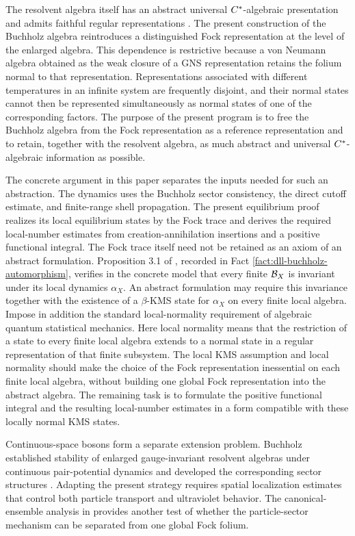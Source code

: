 \documentclass[11pt,a4paper]{article}
\theoremstyle{plain}
\theoremstyle{definition}
\theoremstyle{remark}
\begin{document}
The resolvent algebra itself has an abstract universal \(C^{\ast}\)-algebraic presentation and admits faithful regular representations \cite{BuchholzGrundling002}. The present construction of the Buchholz algebra reintroduces a distinguished Fock representation at the level of the enlarged algebra. This dependence is restrictive because a von Neumann algebra obtained as the weak closure of a GNS representation retains the folium normal to that representation. Representations associated with different temperatures in an infinite system are frequently disjoint, and their normal states cannot then be represented simultaneously as normal states of one of the corresponding factors. The purpose of the present program is to free the Buchholz algebra from the Fock representation as a reference representation and to retain, together with the resolvent algebra, as much abstract and universal \(C^{\ast}\)-algebraic information as possible.

The concrete argument in this paper separates the inputs needed for such an abstraction. The dynamics uses the Buchholz sector consistency, the direct cutoff estimate, and finite-range shell propagation. The present equilibrium proof realizes its local equilibrium states by the Fock trace and derives the required local-number estimates from creation-annihilation insertions and a positive functional integral. The Fock trace itself need not be retained as an axiom of an abstract formulation. Proposition 3.1 of \cite{DeuchertLampartLemm001}, recorded in Fact \ref{fact:dll-buchholz-automorphism}, verifies in the concrete model that every finite \(\mathcal{B}_X\) is invariant under its local dynamics \(\alpha_X\). An abstract formulation may require this invariance together with the existence of a \(\beta\)-KMS state for \(\alpha_X\) on every finite local algebra. Impose in addition the standard local-normality requirement of algebraic quantum statistical mechanics. Here local normality means that the restriction of a state to every finite local algebra extends to a normal state in a regular representation of that finite subsystem. The local KMS assumption and local normality should make the choice of the Fock representation inessential on each finite local algebra, without building one global Fock representation into the abstract algebra. The remaining task is to formulate the positive functional integral and the resulting local-number estimates in a form compatible with these locally normal KMS states.

Continuous-space bosons form a separate extension problem. Buchholz established stability of enlarged gauge-invariant resolvent algebras under continuous pair-potential dynamics and developed the corresponding sector structures \cite{DetlevBuchholz002,DetlevBuchholz003}. Adapting the present strategy requires spatial localization estimates that control both particle transport and ultraviolet behavior. The canonical-ensemble analysis in \cite{DetlevBuchholz012} provides another test of whether the particle-sector mechanism can be separated from one global Fock folium.
\end{document}
